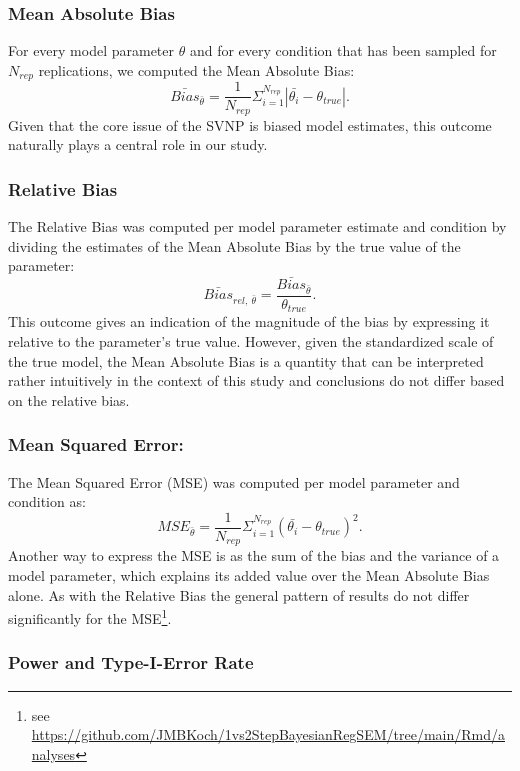 \documentclass[
  man, donotrepeattitle,floatsintext]{apa6}
\begin{document}
\subsubsection{Mean Absolute Bias}\label{mean-absolute-bias}

For every model parameter \(\theta\) and for every condition that has been
sampled for \(N_{rep}\) replications, we computed the Mean Absolute Bias:
\[\bar{Bias}_{\bar{\theta}} = \frac{1}{N_{rep}} \Sigma_{i = 1}^{N_{rep}} |\bar{\theta_i} - \theta_{true}|.\]
Given that the core issue of the SVNP is biased model estimates, this
outcome naturally plays a central role in our study.

\subsubsection{Relative Bias}\label{relative-bias}

The Relative Bias was computed per model parameter estimate and
condition by dividing the estimates of the Mean Absolute Bias by the
true value of the parameter:
\[\bar{Bias}_{rel, \ \bar{\theta} } = \frac{\bar{Bias}_{\bar{\theta}}}{\theta_{true} }.\]
This outcome gives an indication of the magnitude of the bias by
expressing it relative to the parameter's true value. However, given the
standardized scale of the true model, the Mean Absolute Bias is a
quantity that can be interpreted rather intuitively in the context of
this study and conclusions do not differ based on the relative bias.

\subsubsection{Mean Squared Error:}\label{mean-squared-error}

The Mean Squared Error (MSE) was computed per model parameter and
condition as:
\[MSE_{\bar{\theta}} = \frac{1}{N_{rep}} \Sigma_{i = 1}^{N_{rep}} (\bar{\theta_i} - \theta_{true})^2.\]
Another way to express the MSE is as the sum of the bias and the
variance of a model parameter, which explains its added value over the
Mean Absolute Bias alone. As with the Relative Bias the general pattern
of results do not differ significantly for the MSE\footnote{see
  \url{https://github.com/JMBKoch/1vs2StepBayesianRegSEM/tree/main/Rmd/analyses}}.

\subsubsection{Power and Type-I-Error Rate}\label{power-and-type-i-error-rate}
\end{document}
